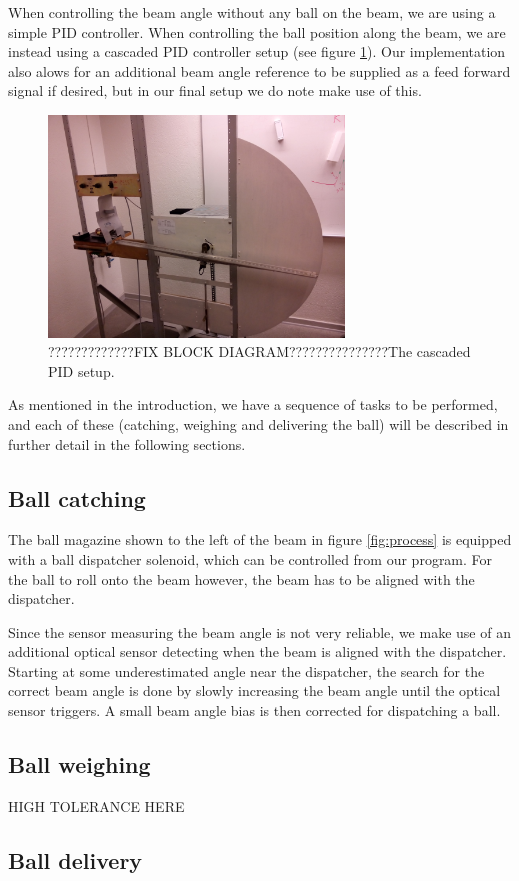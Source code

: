 When controlling the beam angle without any ball on the beam, we are using a simple PID controller. When controlling the ball position along the beam, we are instead using a cascaded PID controller setup (see figure \ref{fig:cascaded_pid}).
Our implementation also alows for an additional beam angle reference to be supplied as a feed forward signal if desired, but in our final setup we do note make use of this.
\begin{figure}
\centering
\includegraphics[width=0.7\textwidth]{figures/process_fig.jpg}
\caption{?????????????FIX BLOCK DIAGRAM???????????????The cascaded PID setup.}\label{fig:cascaded_pid}
\end{figure}

As mentioned in the introduction, we have a sequence of tasks to be performed, and each of these (catching, weighing and delivering the ball) will be described in further detail in the following sections.

\subsection{Ball catching}\label{sec:ball_catching}
The ball magazine shown to the left of the beam in figure \ref{fig:process} is equipped with a ball dispatcher solenoid, which can be controlled from our program.
For the ball to roll onto the beam however, the beam has to be aligned with the dispatcher.

Since the sensor measuring the beam angle is not very reliable, we make use of an additional optical sensor detecting when the beam is aligned with the dispatcher.
Starting at some underestimated angle near the dispatcher, the search for the correct beam angle is done by slowly increasing the beam angle until the optical sensor triggers. A small beam angle bias is then corrected for dispatching a ball.

\subsection{Ball weighing}
HIGH TOLERANCE HERE \\

\subsection{Ball delivery}


